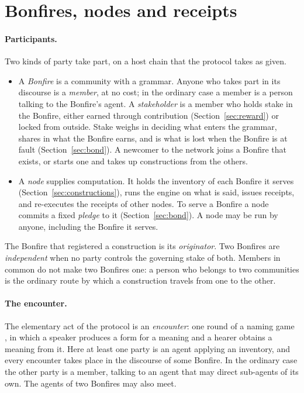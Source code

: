\section{Bonfires, nodes and receipts}\label{sec:encounters}

\paragraph{Participants.} Two kinds of party take part, on a host chain that the protocol takes as given.
\begin{itemize}
  \item A \emph{Bonfire} is a community with a grammar. Anyone who takes part in its discourse is a \emph{member},
  at no cost; in the ordinary case a member is a person talking to the Bonfire's agent. A \emph{stakeholder} is a
  member who holds stake in the Bonfire, either earned through contribution (Section~\ref{sec:reward}) or locked
  from outside. Stake weighs in deciding what enters the grammar, shares in what the Bonfire earns, and is what is
  lost when the Bonfire is at fault (Section~\ref{sec:bond}). A newcomer to the network joins a Bonfire that
  exists, or starts one and takes up constructions from the others.
  \item A \emph{node} supplies computation. It holds the inventory of each Bonfire it serves (Section~\ref{sec:constructions}), runs the engine on what
  is said, issues receipts, and re-executes the receipts of other nodes.
  To serve a Bonfire a node commits a fixed \emph{pledge} to it (Section~\ref{sec:bond}). A node may be run by
  anyone, including the Bonfire it serves.
\end{itemize}
The Bonfire that registered a construction is its \emph{originator}. Two Bonfires are \emph{independent} when no
party controls the governing stake of both. Members in common do not make two Bonfires one: a person who belongs
to two communities is the ordinary route by which a construction travels from one to the other.

\paragraph{The encounter.} The elementary act of the protocol is an \emph{encounter}: one round of a naming game
\citep{steels1995spatial,baronchelli2006sharp}, in which a speaker produces a form for a meaning and a hearer
obtains a meaning from it. Here at least one party is an agent applying an inventory, and every encounter
takes place in the discourse of some Bonfire. In the ordinary case the other party is a member, talking to an agent
that may direct sub-agents of its own. The agents of two Bonfires may also meet.


